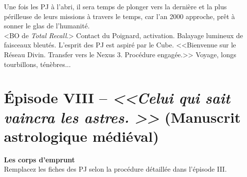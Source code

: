\documentclass[11pt,twoside,a4paper]{book}
\begin{document}
Une fois les PJ {\`a} l'abri, il sera temps de plonger vers la derni{\`e}re et la plus p{\'e}rilleuse de leurs missions {\`a} travers le temps, car l'an 2000 approche, pr{\^e}t {\`a} sonner le glas de l'humanit{\'e}.~\\

<BO de \emph{Total Recall}.> Contact du Poignard, activation. Balayage lumineux de faisceaux bleut{\'e}s. L'esprit des PJ est aspir{\'e} par le Cube. <<Bienvenue sur le R{\'e}seau Divin. Transfer vers le Nexus 3. Proc{\'e}dure engag{\'e}e.>> Voyage, longs tourbillons, t{\'e}n{\`e}bres...~\\

\clearpage

\section*{{\'E}pisode VIII -- \emph{<<\textbf{Celui qui sait vaincra les astres. }>>} (Manuscrit astrologique m{\'e}di{\'e}val)}


\textbf{\large Les corps d'emprunt}~\\

Remplacez les fiches des PJ selon la proc{\'e}dure d{\'e}taill{\'e}e dans l'{\'e}pisode III. ~\\ %
\end{document}

